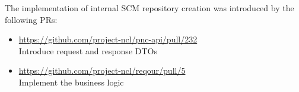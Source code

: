 \documentclass[../main.tex]{subfiles}
\begin{document}
The implementation of internal SCM repository creation was introduced by the following PRs:

\begin{itemize}
    \item \url{https://github.com/project-ncl/pnc-api/pull/232}\\
    Introduce request and response DTOs

    \item \url{https://github.com/project-ncl/reqour/pull/5}\\
    Implement the business logic
\end{itemize}
\end{document}
